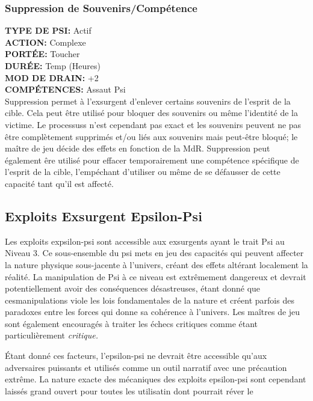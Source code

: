 \subsubsection{Suppression de Souvenirs/Compétence} \textbf{TYPE DE PSI:} Actif \\ \textbf{ACTION:} Complexe \\ \textbf{PORTÉE:} Toucher \\ \textbf{DURÉE:} Temp (Heures) \\ \textbf{MOD DE DRAIN:} +2 \\ \textbf{COMPÉTENCES:} Assaut Psi \\ Suppression permet à l'exsurgent d'enlever certains souvenirs de l'esprit de la cible. Cela peut être utilisé pour bloquer des souvenirs ou même l'identité de la victime. Le processuss n'est cependant pas exact et les souvenirs peuvent ne pas être complètement supprimés et/ou liés aux souvenirs mais peut-être bloqué; le maître de jeu décide des effets en fonction de la MdR. Suppression peut également êre utilisé pour effacer temporairement une compétence spécifique de l'esprit de la cible, l'empéchant d'utiliser ou même de se défausser de cette capacité tant qu'il est affecté. 





\subsection{Exploits Exsurgent Epsilon-Psi} 

Les exploits expsilon-psi sont accessible aux exsurgents ayant le trait Psi au Niveau 3. Ce sous-ensemble du psi mets en jeu des capacités qui peuvent affecter la nature physique sous-jacente à l'univers, créant des effets altérant localement la réalité. La manipulation de Psi à ce niveau est extrêmement dangereux et devrait potentiellement avoir des conséquences désastreuses, étant donné que cesmanipulations viole les lois fondamentales de la nature et créent parfois des paradoxes entre les forces qui donne sa cohérence à l'univers. Les maîtres de jeu sont également encouragés à traiter les échecs critiques comme étant particulièrement \textit{critique.} 

Étant donné ces facteurs, l'epsilon-psi ne devrait être accessible qu'aux adversaires puissants et utilisés comme un outil narratif avec une précaution extrême. La nature exacte des mécaniques des exploits epsilon-psi sont cependant laissés grand ouvert pour toutes les utilisatin dont pourrait réver le 

